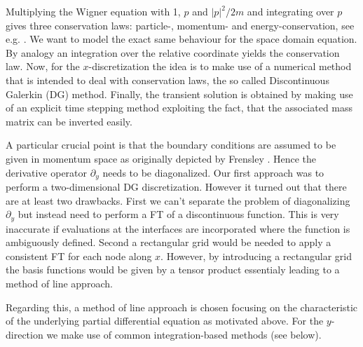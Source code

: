 Multiplying the Wigner equation with 1, $p$ and $|p|^2/2m$ and integrating over $p$ gives three conservation laws: particle-, momentum- and energy-conservation, see e.g. \cite{gardner1998approximation}. We want to model the exact same behaviour for the space domain equation. By analogy an integration over the relative coordinate yields the conservation law. Now, for the $x$-discretization the idea is to make use of a numerical method that is intended to deal with conservation laws, the so called Discontinuous Galerkin (DG) method. Finally, the transient solution is obtained by making use of an explicit time stepping method exploiting the fact, that the associated mass matrix can be inverted easily.

A particular crucial point is that the boundary conditions are assumed to be given in momentum space as originally depicted by Frensley \cite{frensley2}. Hence the derivative operator $\partial_y$ needs to be diagonalized. Our first approach was to perform a two-dimensional DG discretization. However it turned out that there are at least two drawbacks. First we can't separate the problem of diagonalizing $\partial_y$ but instead need to perform a FT of a discontinuous function. This is very inaccurate if evaluations at the interfaces are incorporated where the function is ambiguously defined. Second a rectangular grid would be needed to apply a consistent FT for each node along $x$. However, by introducing a rectangular grid the basis functions would be given by a tensor product essentialy leading to a method of line approach.

Regarding this, a method of line approach is chosen focusing on the characteristic of the underlying partial differential equation as motivated above. For the $y$-direction we make use of common integration-based methods (see below).

